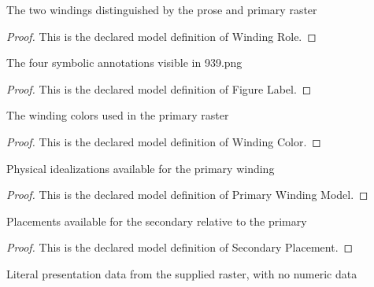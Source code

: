 \begin{definition}
  \label{def:physics:phyx-mini-0939:phyxminiproblems-problemphyxmini0939-windingrole}
  The two windings distinguished by the prose and primary raster
\end{definition}
\begin{proof}
  This is the declared model definition of Winding Role.
\end{proof}
\begin{definition}
  \label{def:physics:phyx-mini-0939:phyxminiproblems-problemphyxmini0939-figurelabel}
  The four symbolic annotations visible in 939.png
\end{definition}
\begin{proof}
  This is the declared model definition of Figure Label.
\end{proof}
\begin{definition}
  \label{def:physics:phyx-mini-0939:phyxminiproblems-problemphyxmini0939-windingcolor}
  The winding colors used in the primary raster
\end{definition}
\begin{proof}
  This is the declared model definition of Winding Color.
\end{proof}
\begin{definition}
  \label{def:physics:phyx-mini-0939:phyxminiproblems-problemphyxmini0939-primarywindingmodel}
  Physical idealizations available for the primary winding
\end{definition}
\begin{proof}
  This is the declared model definition of Primary Winding Model.
\end{proof}
\begin{definition}
  \label{def:physics:phyx-mini-0939:phyxminiproblems-problemphyxmini0939-secondaryplacement}
  Placements available for the secondary relative to the primary
\end{definition}
\begin{proof}
  This is the declared model definition of Secondary Placement.
\end{proof}
\begin{definition}
  \label{def:physics:phyx-mini-0939:phyxminiproblems-problemphyxmini0939-teslacoilfigure}
  Literal presentation data from the supplied raster, with no numeric data
\end{definition}

